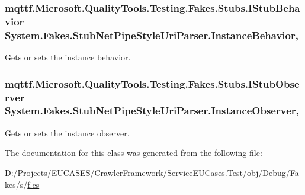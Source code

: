 \hypertarget{class_system_1_1_fakes_1_1_stub_net_pipe_style_uri_parser_a25ac806658cb7bd7241af54781520c47}{
\subsubsection[{Instance\-Behavior}]{\setlength{\rightskip}{0pt plus 5cm}mqttf.\-Microsoft.\-Quality\-Tools.\-Testing.\-Fakes.\-Stubs.\-I\-Stub\-Behavior System.\-Fakes.\-Stub\-Net\-Pipe\-Style\-Uri\-Parser.\-Instance\-Behavior\hspace{0.3cm}{\ttfamily [get]}, {\ttfamily [set]}}}\label{class_system_1_1_fakes_1_1_stub_net_pipe_style_uri_parser_a25ac806658cb7bd7241af54781520c47}


Gets or sets the instance behavior.

\hypertarget{class_system_1_1_fakes_1_1_stub_net_pipe_style_uri_parser_ac54e5168390830f8bc8911567f5a712e}{
\subsubsection[{Instance\-Observer}]{\setlength{\rightskip}{0pt plus 5cm}mqttf.\-Microsoft.\-Quality\-Tools.\-Testing.\-Fakes.\-Stubs.\-I\-Stub\-Observer System.\-Fakes.\-Stub\-Net\-Pipe\-Style\-Uri\-Parser.\-Instance\-Observer\hspace{0.3cm}{\ttfamily [get]}, {\ttfamily [set]}}}\label{class_system_1_1_fakes_1_1_stub_net_pipe_style_uri_parser_ac54e5168390830f8bc8911567f5a712e}


Gets or sets the instance observer.



The documentation for this class was generated from the following file\-:\begin{DoxyCompactItemize}
\item 
D\-:/\-Projects/\-E\-U\-C\-A\-S\-E\-S/\-Crawler\-Framework/\-Service\-E\-U\-Cases.\-Test/obj/\-Debug/\-Fakes/s/\hyperlink{s_2f_8cs}{f.\-cs}\end{DoxyCompactItemize}
